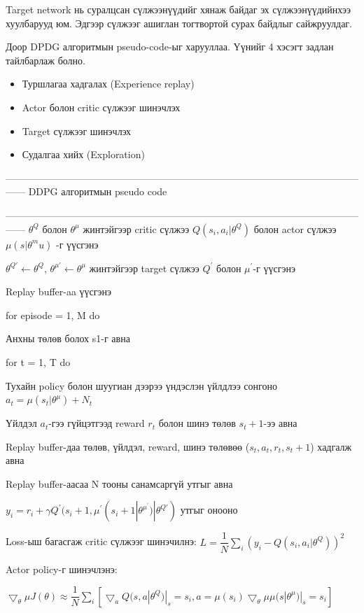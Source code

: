 \documentclass[12pt,A4]{report}
\begin{document}
Target network нь суралцсан сүлжээнүүдийг хянаж байдаг эх сүлжээнүүдийнхээ хуулбарууд юм. Эдгээр сүлжээг ашиглан тогтвортой сурах байдлыг сайжруулдаг.	

Доор DPDG алгоритмын pseudo-code-ыг харууллаа. Үүнийг 4 хэсэгт задлан тайлбарлаж болно.

\begin{itemize}
	\item Туршлагаа хадгалах (Experience replay)
	\item Actor болон critic сүлжээг шинэчлэх
	\item Target сүлжээг шинэчлэх
	\item Судалгаа хийх (Exploration)
\end{itemize} 

------------------------------------------------------------------------------------------------------------------
DDPG алгоритмын pseudo code

------------------------------------------------------------------------------------------------------------------
$\theta^Q$ болон $\theta^{\mu}$ жинтэйгээр critic сүлжээ $Q(s_i,a_i|\theta^Q)$ болон actor сүлжээ $\mu(s|\theta^mu)$ -г үүсгэнэ

$\theta^{Q{'}} \longleftarrow \theta^Q$, $\theta^{\mu{'}} \longleftarrow \theta^\mu$ жинтэйгээр target сүлжээ $Q^{'}$ болон $\mu^{'}$-г үүсгэнэ

Replay buffer-aa үүсгэнэ

for episode = 1, M do

\quad Анхны төлөв болох s1-г авна

\quad for t = 1, T do

\quad\quad Тухайн policy болон шуугиан дээрээ үндэслэн үйлдлээ сонгоно $a_t = \mu(s_t|\theta^\mu)+N_t$

\quad\quad Үйлдэл $a_t$-гээ гүйцэтгээд reward $r_t$ болон шинэ төлөв $s_t+1$-ээ авна

\quad\quad Replay buffer-даа төлөв, үйлдэл, reward, шинэ төлөвөө ($s_t, a_t, r_t, s_t+1$) хадгалж авна

\quad\quad Replay buffer-аасаа N тооны санамсаргүй утгыг авна

\quad\quad $y_i=r_i+\gamma{Q^{'}}(s_i+1,\mu^{'}(s_i+1|\theta^{\mu^{'}})|\theta^{Q{'}})$ утгыг онооно

\quad\quad Loss-ыш багасгаж critic сүлжээг шинэчилнэ: $L = \dfrac{1}{N}\sum_{i}(y_i-Q(s_i,a_i|\theta^Q))^2$

\quad\quad Actor policy-г шинэчлэнэ: 
\begin{center}
$\bigtriangledown_\theta\mu J(\theta) \approx \dfrac{1}{N}\sum_{i}[\bigtriangledown_a Q(s, a|\theta^Q)|_s=s_i,a=\mu(s_i)\bigtriangledown_\theta\mu \mu(s|\theta^\mu)|_s=s_i]$
\end{center}
\end{document}
